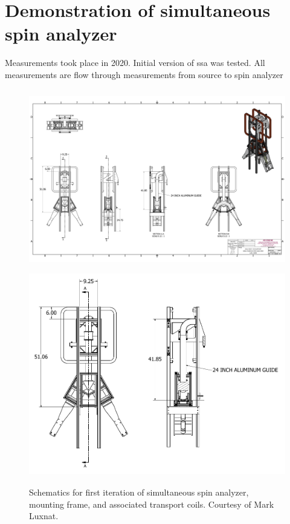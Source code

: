 
\chapter{Demonstration of simultaneous spin analyzer}\label{chap:ssa_2020}


Measurements took place in 2020. Initial version of \acrshort{ssa} was tested. All measurements are flow through measurements from source to spin analyzer

\begin{figure}
    \centering
    \includegraphics[height=3.1in]{figures/ssa_schematic_colorized.pdf}
    \includegraphics[height=3.5in]{figures/ssa_schematics.pdf}
    \caption
    {Schematics for first iteration of simultaneous spin analyzer, mounting frame, and associated transport coils. Courtesy of Mark Luxnat.}
    \label{fig:ssa_schematic}
\end{figure}

